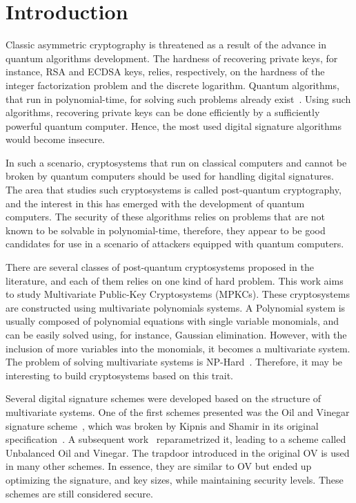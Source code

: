 \documentclass{ufsctex/ufsctex}
\makeatletter
\renewcommand{\listadeabreviaturas}{
	\pretextualchapter{List of Acronyms}\@starttoc{las}}
\renewcommand{\listadesimbolos}{
	\pretextualchapter{List of Symbols}\@starttoc{lsb}}
\renewcommand{\listadealgoritmos}{
	\pretextualchapter{List of Algorithms}\@starttoc{loa}}
\makeatother
\begin{document}
\capa{}
\pretextuais{}
\listadefiguras{}
\listadetabelas{}
\listadeabreviaturas{}
\sumario{}

\chapter{Introduction}

Classic asymmetric cryptography is threatened as a result of the advance in
quantum algorithms development. The hardness of recovering private keys, for
instance, RSA and ECDSA keys, relies, respectively, on the hardness
of the integer factorization problem and the discrete logarithm. Quantum
algorithms, that run in polynomial-time, for solving such problems already
exist~\cite{shor1999polynomial}. Using such algorithms, recovering private keys
can be done efficiently by a sufficiently powerful quantum computer. Hence, the
most used digital signature algorithms would become insecure.

In such a scenario, cryptosystems that run on classical computers and cannot be
broken by quantum computers should be used for handling digital signatures. The
area that studies such cryptosystems is called post-quantum cryptography, and
the interest in this has emerged with the development of quantum computers. The
security of these algorithms relies on problems that are not known to be
solvable in polynomial-time, therefore, they appear to be good candidates for
use in a scenario of attackers equipped with quantum computers.

There are several classes of post-quantum cryptosystems proposed in the
literature, and each of them relies on one kind of hard problem. This work aims
to study Multivariate Public-Key Cryptosystems
(MPKCs). These
cryptosystems are constructed using multivariate polynomials systems. A
Polynomial system is usually composed of polynomial equations with single
variable monomials, and can be easily solved using, for instance, Gaussian
elimination. However, with the inclusion of more variables into the monomials,
it becomes a multivariate system. The problem of solving multivariate systems
is NP-Hard~\cite{garey1979npc}. Therefore, it may be interesting to build
cryptosystems based on this trait.

Several digital signature schemes were developed based on the structure of
multivariate systems. One of the first schemes presented was the Oil and
Vinegar signature scheme~\cite{patarin1997ov}, which
was broken by Kipnis and Shamir in its original
specification~\cite{kipnis1998cryptanalysis}. A subsequent
work~\cite{kipnis1999unbalanced} reparametrized it, leading to a scheme called
Unbalanced Oil and Vinegar. The trapdoor
introduced in the original OV is used in many other schemes. In essence, they
are similar to OV but ended up optimizing the signature, and key sizes, while
maintaining security levels. These schemes are still considered secure.
\end{document}
